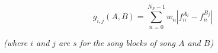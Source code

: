 \begin{equation}
g_{i,j}(A,B) = \sum_{n=0}^{N_F-1} w_n | f_n^{A_i} - f_n^{B_j} |
\label{eq:feature_block_distance}
\end{equation}
\begin{center}
	\small \textit{(where $i$ and $j$ are $s$ for the song blocks of song $A$ and $B$)}
\end{center}
